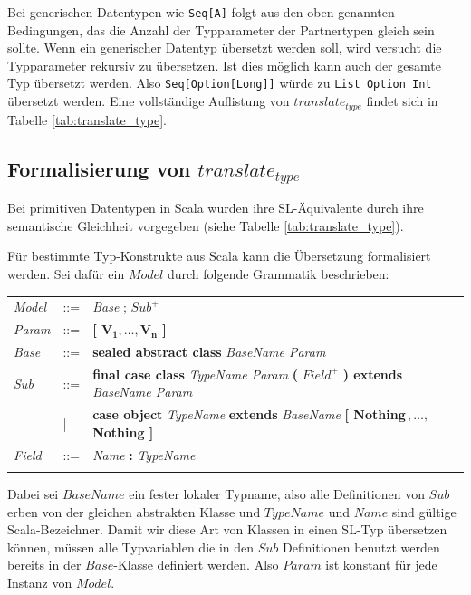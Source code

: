 \documentclass[12pt,bibtotoc]{scrreprt}
\begin{document}
Bei generischen Datentypen wie \lstinline!Seq[A]! folgt aus den oben genannten Bedingungen, das die Anzahl der Typparameter der Partnertypen gleich sein sollte. Wenn ein generischer Datentyp übersetzt werden soll, wird versucht die Typparameter rekursiv zu übersetzen. Ist dies möglich kann auch der gesamte Typ übersetzt werden. Also \lstinline!Seq[Option[Long]]! würde zu \lstinline!List Option Int! übersetzt werden. Eine vollständige Auflistung von $translate_{type}$ findet sich in Tabelle \ref{tab:translate_type}.

\subsection{Formalisierung von $translate_{type}$}
\label{subsec:formal-translate-typ}

Bei primitiven Datentypen in Scala wurden ihre SL-Äquivalente durch ihre semantische Gleichheit vorgegeben (siehe Tabelle \ref{tab:translate_type}). 

Für bestimmte Typ-Konstrukte aus Scala kann die Übersetzung formalisiert werden. Sei dafür ein $Model$ durch folgende Grammatik beschrieben:

\begin{tabular}{lll}
\emph{Model} & ::= & \emph{Base} ; \emph{$Sub^+$}\\
\emph{Param} & ::= & \textbf{[ $\mathbf{V_1, \dots ,V_n}$ ]}\\
\emph{Base}  & ::= & \textbf{sealed abstract class} \emph{BaseName Param}\\
\emph{Sub}   & ::=   & \textbf{final case class} \emph{TypeName Param} \textbf{(} $Field^+$ \textbf{) extends} \emph{BaseName Param}\\
 & | & \textbf{case object} \emph{TypeName} \textbf{extends} \emph{BaseName} \textbf{[ Nothing$\,,\dots,\,$Nothing ]}\\
\emph{Field} & ::= & \emph{Name} \textbf{:} \emph{TypeName}\\
\\
\end{tabular}

Dabei sei $BaseName$ ein fester lokaler Typname, also alle Definitionen von $Sub$ erben von der gleichen abstrakten Klasse und $TypeName$ und $Name$ sind gültige Scala-Bezeichner. Damit wir diese Art von Klassen in einen SL-Typ übersetzen können, müssen alle Typvariablen die in den $Sub$ Definitionen benutzt werden bereits in der $Base$-Klasse definiert werden. Also $Param$ ist konstant für jede Instanz von $Model$.
\end{document}
